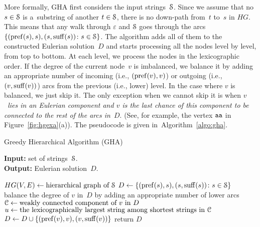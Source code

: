 More formally, GHA first considers the input
strings~${\cal S}$. Since we assume that 
no $s \in {\cal S}$ is a~substring of another 
$t \in {\cal S}$, there is no down-path from~$t$ to~$s$ in $HG$. 
This means that any walk through $\varepsilon$ and ${\cal S}$ goes through the arcs $\{(\operatorname{pref}(s), s), (s, \operatorname{suff}(s)) \colon s \in {\cal S}\}$. The algorithm adds all of them to the constructed Eulerian solution~$D$ and starts processing all the nodes level by level, from top to bottom. At each level, we process the nodes in the lexicographic order. If the degree of the current node~$v$ is imbalanced, we balance it by adding an appropriate number of incoming (i.e., $(\operatorname{pref}(v),v)$) or outgoing (i.e., $(v, \operatorname{suff}(v))$) arcs from the previous (i.e., lower) level. In the case where $v$ is balanced, we just skip it. The only exception when we cannot skip it is when {\em $v$~lies in an Eulerian component and $v$ is the last chance of this component to be connected to the rest of the arcs in~$D$}. (See, for example, the vertex $ {\tt aa}$ in Figure~\ref{fig:hgexa}(a)). The pseudocode is given in~Algorithm~\ref{algo:gha}. 


\begin{algorithm}[!ht]
\caption{Greedy Hierarchical Algorithm (GHA)}\label{algo:gha}
\hspace*{\algorithmicindent} \textbf{Input:} set of strings~${\cal S}$.\\
\hspace*{\algorithmicindent} \textbf{Output:} Eulerian solution~$D$.
\begin{algorithmic}[1]
\State $HG(V,E) \gets \text{hierarchical graph of ${\cal S}$}$ 
\State\label{alg:gha_init}$D \gets \{(\operatorname{pref}(s), s), (s, \operatorname{suff}(s)) \colon s \in {\cal S}\}$
\label{alg:for}
\State\label{alg:step6} balance the degree of $v$ in~$D$ by adding an appropriate number of lower arcs
\Else
\State\label{alg:else} ${\cal C} \gets \text{weakly connected component of $v$ in $D$}$
\State $u \gets \text{the lexicographically largest string among shortest strings in ${\cal C}$}$
\State\label{alg:last} $D \gets D \cup \{(\operatorname{pref}(v), v), (v, \operatorname{suff}(v))\}$
\EndIf
\EndIf
\EndFor
\EndFor
\State return $D$
\end{algorithmic}
\end{algorithm}


